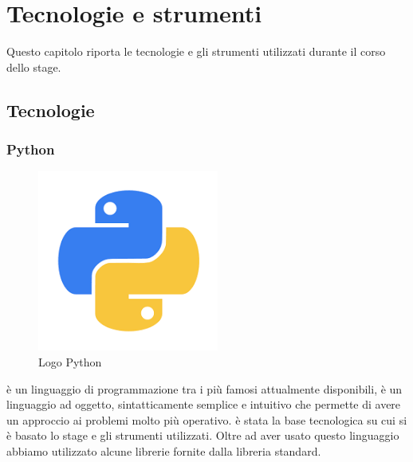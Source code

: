 
\hypertarget{(chap:capitolo6)}{}
\chapter{Tecnologie e strumenti}
Questo capitolo riporta le tecnologie e gli strumenti utilizzati durante il corso dello stage.
\section{Tecnologie}
\subsection{Python}
\begin{figure}[H]
	\begin{center} \includegraphics[scale=0.5]{figures/python}
		\caption[Logo Python]{Logo Python}  
	\end{center}
\end{figure}
 è un linguaggio di programmazione tra i più famosi attualmente disponibili, è un linguaggio ad oggetto, sintatticamente semplice e intuitivo che permette di avere un approccio ai problemi molto più operativo.  è stata la base tecnologica su cui si è basato lo stage e gli strumenti utilizzati. Oltre ad aver usato questo linguaggio abbiamo utilizzato alcune librerie fornite dalla libreria standard.


